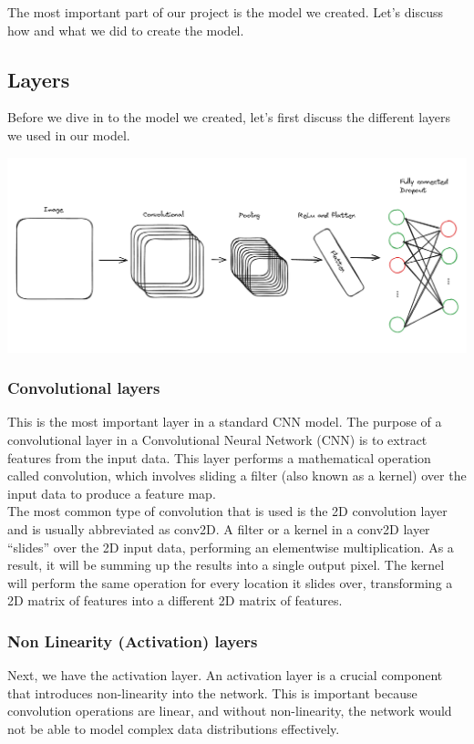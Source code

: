 \documentclass[../paper.tex]{subfiles}
\begin{document}
    The most important part of our project is the model we created.
    Let's discuss how and what we did to create the model.
    \subsection{Layers}
    Before we dive in to the model we created, let's first discuss the different layers we used in our model.

    \includegraphics[width=\linewidth]{network}

    \subsubsection{Convolutional layers}
    This is the most important layer in a standard CNN model.
    The purpose of a convolutional layer in a Convolutional Neural Network (CNN) is to extract features from the input data. 
    This layer performs a mathematical operation called convolution, 
    which involves sliding a filter (also known as a kernel) over the input data to produce a feature map.\cite{o4}\\
    The most common type of convolution that is used is the 2D convolution layer and is usually abbreviated as conv2D. 
    A filter or a kernel in a conv2D layer “slides” over the 2D input data, performing an elementwise multiplication. 
    As a result, it will be summing up the results into a single output pixel. 
    The kernel will perform the same operation for every location it slides over, transforming a 2D matrix of features into a different 2D matrix of features.\cite{o5}
    \subsubsection{Non Linearity (Activation) layers}
    Next, we have the activation layer.
    An activation layer is a crucial component that introduces non-linearity into the network. 
    This is important because convolution operations are linear, and without non-linearity, the network would not be able to model complex data distributions effectively.
\end{document}
